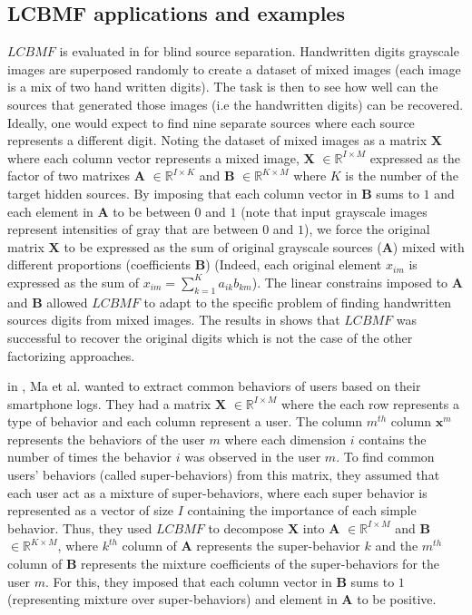\subsection{LCBMF applications and examples}

$LCBMF$ is evaluated in \cite{bnmf} for blind source separation. Handwritten digits grayscale images are superposed randomly to create a dataset of mixed images (each image is a mix of two hand written digits). The task is then to see how well can the sources that generated those images (i.e the handwritten digits) can be recovered. Ideally, one would expect to find nine separate sources where each source represents a different digit. Noting the dataset of mixed images as a matrix $\boldsymbol{X}$ where each column vector represents a mixed image, $\boldsymbol{X}$ $\in\mathbb{R}^{I\times M}$ expressed as the factor of two matrixes $\boldsymbol{A}$ $\in\mathbb{R}^{I\times K}$ and $\boldsymbol{B}$ $\in\mathbb{R}^{K\times M}$ where $K$ is the number of the target hidden sources. By imposing that each column vector in $\boldsymbol{B}$ sums to $1$ and each element in $\boldsymbol{A}$ to be between $0$ and $1$ (note that input grayscale images represent intensities of gray that are between $0$ and $1$), we force the original matrix $\boldsymbol{X}$ to be expressed as the sum of original grayscale sources ($\boldsymbol{A}$) mixed with different proportions (coefficients $\boldsymbol{B}$) (Indeed, each original element $x_{im}$ is expressed as the sum of $x_{im}=\sum_{k=1}^{K}a_{ik}b_{km}$). The linear constrains imposed to $\boldsymbol{A}$ and $\boldsymbol{B}$ allowed $LCBMF$ to adapt to the specific problem of finding handwritten sources digits from mixed images. The results in \cite{bnmf} shows that $LCBMF$ was successful to recover the original digits which is not the case of the other factorizing approaches. \par

in \cite{superbehaviors}, Ma et al. wanted to extract common behaviors of users based on their smartphone logs. They had a matrix $\boldsymbol{X}$ $\in\mathbb{R}^{I\times M}$ where the each row represents a type of behavior and each column represent a user.  The column $m^{th}$ column $\boldsymbol{x}^{m}$ represents the behaviors of the user $m$ where each dimension $i$ contains the number of times the behavior $i$ was observed in the user $m$. To find common users' behaviors (called super-behaviors) from this matrix, they assumed that each user act as a mixture of super-behaviors, where each super behavior is represented as a vector of size $I$ containing the importance of each simple behavior. Thus, they used $LCBMF$ to decompose $\boldsymbol{X}$ into $\boldsymbol{A}$ $\in\mathbb{R}^{I\times M}$ and $\boldsymbol{B}$ $\in\mathbb{R}^{K\times M}$, where  $k^{th}$ column of $\boldsymbol{A}$ represents the super-behavior $k$ and the $m^{th}$ column of $\boldsymbol{B}$ represents the mixture coefficients of the super-behaviors for the user $m$. For this, they imposed that each column vector in $\boldsymbol{B}$ sums to $1$ (representing mixture over super-behaviors) and element in $\boldsymbol{A}$ to be positive. \par

